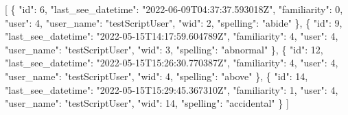 \documentclass[
]{article}
\newenvironment{Shaded}{}{}
\newcommand{\DataTypeTok}[1]{\textcolor[rgb]{0.56,0.13,0.00}{#1}}
\newcommand{\DecValTok}[1]{\textcolor[rgb]{0.25,0.63,0.44}{#1}}
\newcommand{\FunctionTok}[1]{\textcolor[rgb]{0.02,0.16,0.49}{#1}}
\newcommand{\OtherTok}[1]{\textcolor[rgb]{0.00,0.44,0.13}{#1}}
\newcommand{\StringTok}[1]{\textcolor[rgb]{0.25,0.44,0.63}{#1}}
\begin{document}
\begin{Shaded}
\begin{Highlighting}[]
\OtherTok{[}
  \FunctionTok{\{}
    \DataTypeTok{"id"}\FunctionTok{:} \DecValTok{6}\FunctionTok{,}
    \DataTypeTok{"last\_see\_datetime"}\FunctionTok{:} \StringTok{"2022{-}06{-}09T04:37:37.593018Z"}\FunctionTok{,}
    \DataTypeTok{"familiarity"}\FunctionTok{:} \DecValTok{0}\FunctionTok{,}
    \DataTypeTok{"user"}\FunctionTok{:} \DecValTok{4}\FunctionTok{,}
    \DataTypeTok{"user\_name"}\FunctionTok{:} \StringTok{"testScriptUser"}\FunctionTok{,}
    \DataTypeTok{"wid"}\FunctionTok{:} \DecValTok{2}\FunctionTok{,}
    \DataTypeTok{"spelling"}\FunctionTok{:} \StringTok{"abide"}
  \FunctionTok{\}}\OtherTok{,}
  \FunctionTok{\{}
    \DataTypeTok{"id"}\FunctionTok{:} \DecValTok{9}\FunctionTok{,}
    \DataTypeTok{"last\_see\_datetime"}\FunctionTok{:} \StringTok{"2022{-}05{-}15T14:17:59.604789Z"}\FunctionTok{,}
    \DataTypeTok{"familiarity"}\FunctionTok{:} \DecValTok{4}\FunctionTok{,}
    \DataTypeTok{"user"}\FunctionTok{:} \DecValTok{4}\FunctionTok{,}
    \DataTypeTok{"user\_name"}\FunctionTok{:} \StringTok{"testScriptUser"}\FunctionTok{,}
    \DataTypeTok{"wid"}\FunctionTok{:} \DecValTok{3}\FunctionTok{,}
    \DataTypeTok{"spelling"}\FunctionTok{:} \StringTok{"abnormal"}
  \FunctionTok{\}}\OtherTok{,}
  \FunctionTok{\{}
    \DataTypeTok{"id"}\FunctionTok{:} \DecValTok{12}\FunctionTok{,}
    \DataTypeTok{"last\_see\_datetime"}\FunctionTok{:} \StringTok{"2022{-}05{-}15T15:26:30.770387Z"}\FunctionTok{,}
    \DataTypeTok{"familiarity"}\FunctionTok{:} \DecValTok{4}\FunctionTok{,}
    \DataTypeTok{"user"}\FunctionTok{:} \DecValTok{4}\FunctionTok{,}
    \DataTypeTok{"user\_name"}\FunctionTok{:} \StringTok{"testScriptUser"}\FunctionTok{,}
    \DataTypeTok{"wid"}\FunctionTok{:} \DecValTok{4}\FunctionTok{,}
    \DataTypeTok{"spelling"}\FunctionTok{:} \StringTok{"above"}
  \FunctionTok{\}}\OtherTok{,}
  \FunctionTok{\{}
    \DataTypeTok{"id"}\FunctionTok{:} \DecValTok{14}\FunctionTok{,}
    \DataTypeTok{"last\_see\_datetime"}\FunctionTok{:} \StringTok{"2022{-}05{-}15T15:29:45.367310Z"}\FunctionTok{,}
    \DataTypeTok{"familiarity"}\FunctionTok{:} \DecValTok{1}\FunctionTok{,}
    \DataTypeTok{"user"}\FunctionTok{:} \DecValTok{4}\FunctionTok{,}
    \DataTypeTok{"user\_name"}\FunctionTok{:} \StringTok{"testScriptUser"}\FunctionTok{,}
    \DataTypeTok{"wid"}\FunctionTok{:} \DecValTok{14}\FunctionTok{,}
    \DataTypeTok{"spelling"}\FunctionTok{:} \StringTok{"accidental"}
  \FunctionTok{\}}
\OtherTok{]}
\end{Highlighting}
\end{Shaded}
\end{document}
